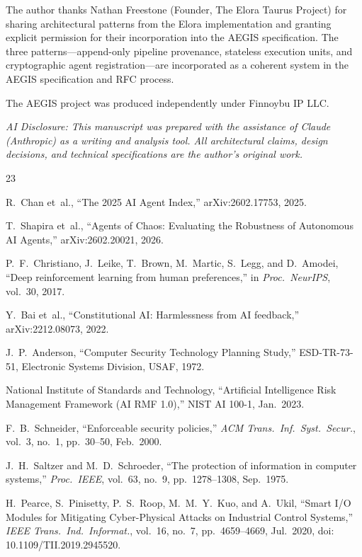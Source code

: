 \documentclass{IEEEcsmag}
\begin{document}
The author thanks Nathan Freestone (Founder, The Elora Taurus Project) for sharing architectural patterns from the Elora implementation and granting explicit permission for their incorporation into the AEGIS specification. The three patterns---append-only pipeline provenance, stateless execution units, and cryptographic agent registration---are incorporated as a coherent system in the AEGIS specification and RFC process.

The AEGIS project was produced independently under Finnoybu IP LLC.

{\it AI Disclosure: This manuscript was prepared with the assistance of Claude (Anthropic) as a writing and analysis tool. All architectural claims, design decisions, and technical specifications are the author's original work.}

\begin{thebibliography}{23}

R.~Chan et~al., ``The 2025 AI Agent Index,'' arXiv:2602.17753, 2025.

T.~Shapira et~al., ``Agents of Chaos: Evaluating the Robustness of Autonomous AI Agents,'' arXiv:2602.20021, 2026.

P.~F.~Christiano, J.~Leike, T.~Brown, M.~Martic, S.~Legg, and D.~Amodei, ``Deep reinforcement learning from human preferences,'' in {\it Proc.\ NeurIPS}, vol.~30, 2017.

Y.~Bai et~al., ``Constitutional AI: Harmlessness from AI feedback,'' arXiv:2212.08073, 2022.

J.~P.~Anderson, ``Computer Security Technology Planning Study,'' ESD-TR-73-51, Electronic Systems Division, USAF, 1972.

National Institute of Standards and Technology, ``Artificial Intelligence Risk Management Framework (AI RMF 1.0),'' NIST AI 100-1, Jan.\ 2023.

F.~B.~Schneider, ``Enforceable security policies,'' {\it ACM Trans.\ Inf.\ Syst.\ Secur.}, vol.~3, no.~1, pp.~30--50, Feb.\ 2000.

J.~H.~Saltzer and M.~D.~Schroeder, ``The protection of information in computer systems,'' {\it Proc.\ IEEE}, vol.~63, no.~9, pp.~1278--1308, Sep.\ 1975.

H.~Pearce, S.~Pinisetty, P.~S.~Roop, M.~M.~Y.~Kuo, and A.~Ukil, ``Smart I/O Modules for Mitigating Cyber-Physical Attacks on Industrial Control Systems,'' {\it IEEE Trans.\ Ind.\ Informat.}, vol.~16, no.~7, pp.~4659--4669, Jul.\ 2020, doi: 10.1109/TII.2019.2945520.


\end{thebibliography}
\end{document}
